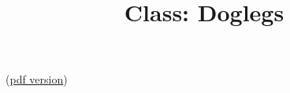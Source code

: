 \documentclass{article}
\begin{document}
\title{Class: Doglegs}

(\href{class_doglegs.pdf}{pdf version})
\end{document}
